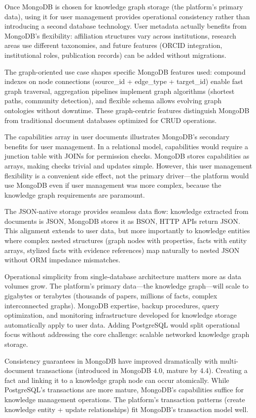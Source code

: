 \documentclass[12pt,a4paper]{article}
\begin{document}
Once MongoDB is chosen for knowledge graph storage (the platform's primary data), using it for user management provides operational consistency rather than introducing a second database technology. User metadata actually benefits from MongoDB's flexibility: affiliation structures vary across institutions, research areas use different taxonomies, and future features (ORCID integration, institutional roles, publication records) can be added without migrations.

The graph-oriented use case shapes specific MongoDB features used: compound indexes on node connections (source\_id + edge\_type + target\_id) enable fast graph traversal, aggregation pipelines implement graph algorithms (shortest paths, community detection), and flexible schema allows evolving graph ontologies without downtime. These graph-centric features distinguish MongoDB from traditional document databases optimized for CRUD operations.

The capabilities array in user documents illustrates MongoDB's secondary benefits for user management. In a relational model, capabilities would require a junction table with JOINs for permission checks. MongoDB stores capabilities as arrays, making checks trivial and updates simple. However, this user management flexibility is a convenient side effect, not the primary driver—the platform would use MongoDB even if user management was more complex, because the knowledge graph requirements are paramount.

The JSON-native storage provides seamless data flow: knowledge extracted from documents is JSON, MongoDB stores it as BSON, HTTP APIs return JSON. This alignment extends to user data, but more importantly to knowledge entities where complex nested structures (graph nodes with properties, facts with entity arrays, stylized facts with evidence references) map naturally to nested JSON without ORM impedance mismatches.

Operational simplicity from single-database architecture matters more as data volumes grow. The platform's primary data—the knowledge graph—will scale to gigabytes or terabytes (thousands of papers, millions of facts, complex interconnected graphs). MongoDB expertise, backup procedures, query optimization, and monitoring infrastructure developed for knowledge storage automatically apply to user data. Adding PostgreSQL would split operational focus without addressing the core challenge: scalable networked knowledge graph storage.

Consistency guarantees in MongoDB have improved dramatically with multi-document transactions (introduced in MongoDB 4.0, mature by 4.4). Creating a fact and linking it to a knowledge graph node can occur atomically. While PostgreSQL's transactions are more mature, MongoDB's capabilities suffice for knowledge management operations. The platform's transaction patterns (create knowledge entity + update relationships) fit MongoDB's transaction model well.
\end{document}
